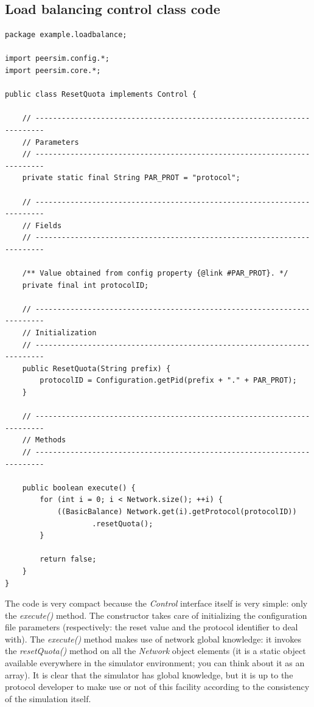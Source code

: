 \documentclass[a4paper,11pt]{article}
\begin{document}
\subsection{Load balancing control class code}

\footnotesize
\begin{verbatim}
package example.loadbalance;

import peersim.config.*;
import peersim.core.*;

public class ResetQuota implements Control {

    // ------------------------------------------------------------------------
    // Parameters
    // ------------------------------------------------------------------------
    private static final String PAR_PROT = "protocol";

    // ------------------------------------------------------------------------
    // Fields
    // ------------------------------------------------------------------------

    /** Value obtained from config property {@link #PAR_PROT}. */
    private final int protocolID;

    // ------------------------------------------------------------------------
    // Initialization
    // ------------------------------------------------------------------------
    public ResetQuota(String prefix) {
        protocolID = Configuration.getPid(prefix + "." + PAR_PROT);
    }

    // ------------------------------------------------------------------------
    // Methods
    // ------------------------------------------------------------------------

    public boolean execute() {
        for (int i = 0; i < Network.size(); ++i) {
            ((BasicBalance) Network.get(i).getProtocol(protocolID))
                    .resetQuota();
        }

        return false;
    }
}
\end{verbatim}
\normalsize

The code is very compact because the \emph{Control} interface itself
is very simple: only the \emph{execute()} method. The constructor takes
care of initializing the configuration file parameters (respectively:
the reset value and the protocol identifier to deal with). The \emph{execute()}
method makes use of network global knowledge: it invokes the \emph{resetQuota()}
method on all the \emph{Network} object elements (it is a static
object available everywhere in the simulator environment; you can think
about it as an array). It is clear that the simulator has global knowledge,
but it is up to the protocol developer to make use or not of this
facility according to the consistency of the simulation itself. 
\end{document}
